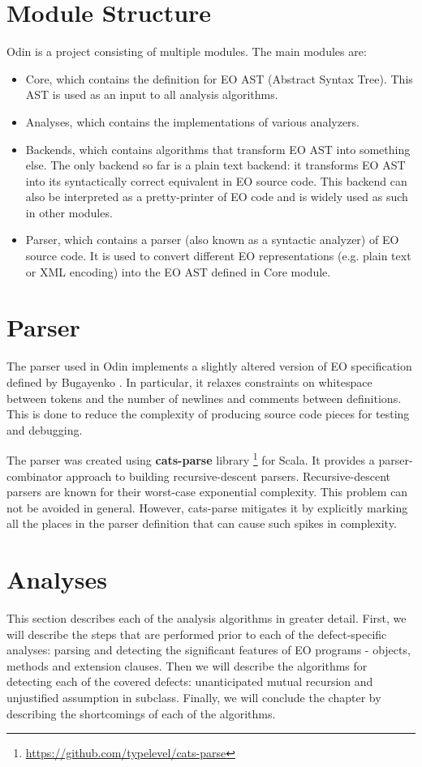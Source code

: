 \section{Module Structure}
Odin is a project consisting of multiple modules. The main modules are:
\begin{itemize}
    \item Core, which contains the definition for EO AST (Abstract Syntax Tree).
          This AST is used as an input to all analysis algorithms.
    \item Analyses, which contains the implementations of various analyzers.
    \item Backends, which contains algorithms that transform EO AST into something else. The only backend so far is a plain text backend: it transforms EO AST into its syntactically correct equivalent in EO source code. This backend can also be interpreted as a pretty-printer of EO code and is widely used as such in other modules.
    \item Parser, which contains a parser (also known as a syntactic analyzer) of EO source code. It is used to convert different EO representations (e.g. plain text or XML encoding) into the EO AST defined in Core module.
\end{itemize}
\section{Parser}
The parser used in Odin implements a slightly altered version of EO specification defined by Bugayenko \cite{eolang}. In particular, it relaxes constraints on whitespace between tokens and the number of newlines and comments between definitions. This is done to reduce the complexity of producing source code pieces for testing and debugging.


The parser was created using \textbf{cats-parse} library \footnote{\url{https://github.com/typelevel/cats-parse}} for Scala. It provides a parser-combinator \cite{hill_combinators_1996} approach to building recursive-descent parsers. Recursive-descent parsers are known for their worst-case exponential complexity. This problem can not be avoided in general. However, cats-parse mitigates it by explicitly marking all the places in the parser definition that can cause such spikes in complexity.

\section{Analyses}
This section describes each of the analysis algorithms in greater detail. First, we will describe the steps that are performed prior to each of the defect-specific analyses: parsing and detecting the significant features of EO programs - objects, methods and extension clauses. Then we will describe the algorithms for detecting each of the covered defects: unanticipated mutual recursion and unjustified assumption in subclass. Finally, we will conclude the chapter by describing the shortcomings of each of the algorithms.


